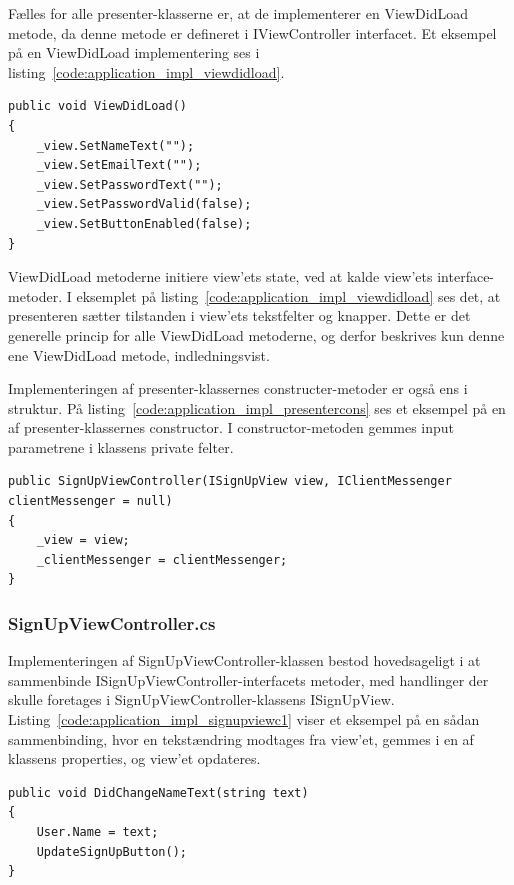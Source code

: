 Fælles for alle presenter-klasserne er, at de implementerer en ViewDidLoad metode, da denne metode er defineret i IViewController interfacet. Et eksempel på en ViewDidLoad implementering ses i listing~\ref{code:application_impl_viewdidload}.

\begin{lstlisting}[caption={ViewDidLoad() i SignUpViewController.cs},label={code:application_impl_viewdidload}]
public void ViewDidLoad()
{
	_view.SetNameText("");
	_view.SetEmailText("");
	_view.SetPasswordText("");
	_view.SetPasswordValid(false);
	_view.SetButtonEnabled(false);
}
\end{lstlisting}

ViewDidLoad metoderne initiere view'ets state, ved at kalde view'ets interface-metoder. I eksemplet på listing~\ref{code:application_impl_viewdidload} ses det, at presenteren sætter tilstanden i view'ets tekstfelter og knapper. Dette er det generelle princip for alle ViewDidLoad metoderne, og derfor beskrives kun denne ene ViewDidLoad metode, indledningsvist.

Implementeringen af presenter-klassernes constructer-metoder er også ens i struktur. På listing~\ref{code:application_impl_presentercons} ses et eksempel på en af presenter-klassernes constructor. I constructor-metoden gemmes input parametrene i klassens private felter.

\begin{lstlisting}[caption={Constructor i SignUpViewController.cs},label={code:application_impl_presentercons}]
public SignUpViewController(ISignUpView view, IClientMessenger clientMessenger = null)
{
	_view = view;
	_clientMessenger = clientMessenger;
}
\end{lstlisting}

\subsubsection{SignUpViewController.cs}
Implementeringen af SignUpViewController-klassen bestod hovedsageligt i at sammenbinde ISignUpViewController-interfacets metoder, med handlinger der skulle foretages i SignUpViewController-klassens ISignUpView. Listing~\ref{code:application_impl_signupviewc1} viser et eksempel på en sådan sammenbinding, hvor en tekstændring modtages fra view'et, gemmes i en af klassens properties, og view'et opdateres.

\begin{lstlisting}[caption={DidChangeNameText(...)},label={code:application_impl_signupviewc1}]
public void DidChangeNameText(string text)
{
	User.Name = text;
	UpdateSignUpButton();
}
\end{lstlisting}

